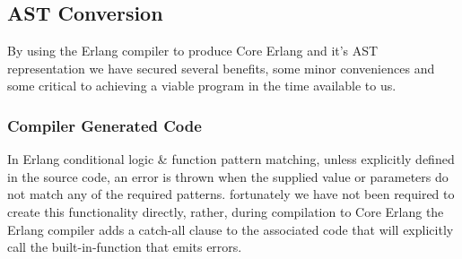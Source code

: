 \documentclass[twoside,12pt,titlepage,a4paper]{article}
\begin{document}
\subsection{AST Conversion}
By using the Erlang compiler to produce Core Erlang and it's AST representation we have secured several benefits, some minor conveniences and some critical to achieving a viable program in the time available to us.
\subsubsection{Compiler Generated Code}
In Erlang conditional logic \& function pattern matching, unless explicitly defined in the source code, an error is thrown when the supplied value or parameters do not match any of the required patterns. fortunately we have not been required to create this functionality directly, rather, during compilation to Core Erlang the Erlang compiler adds a catch-all clause to the associated code that will explicitly call the built-in-function that emits errors.
\end{document}

